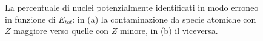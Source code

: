 \begin{figure}[!p] 
	\centering
	\hspace{10mm}
	\caption{La percentuale di nuclei potenzialmente identificati in modo erroneo in funzione di $E_{tot}$: in (a) la contaminazione da specie atomiche con $Z$ maggiore verso quelle con $Z$ minore, in (b) il viceversa.} \label{fig:leakage}
\end{figure}



